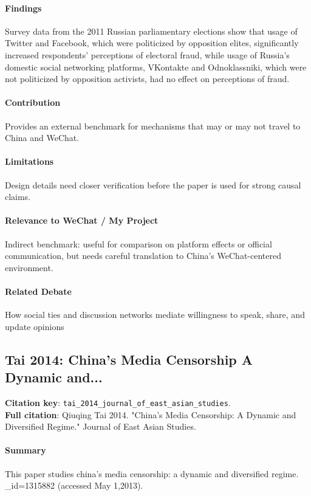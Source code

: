\documentclass[12pt]{article}
\begin{document}
\paragraph{Findings} Survey data from the 2011 Russian parliamentary elections show that usage of Twitter and Facebook, which were politicized by opposition elites, significantly increased respondents' perceptions of electoral fraud, while usage of Russia's domestic social networking platforms, VKontakte and Odnoklassniki, which were not politicized by opposition activists, had no effect on perceptions of fraud.

\paragraph{Contribution} Provides an external benchmark for mechanisms that may or may not travel to China and WeChat.

\paragraph{Limitations} Design details need closer verification before the paper is used for strong causal claims.

\paragraph{Relevance to WeChat / My Project} Indirect benchmark: useful for comparison on platform effects or official communication, but needs careful translation to China's WeChat-centered environment.

\paragraph{Related Debate} How social ties and discussion networks mediate willingness to speak, share, and update opinions


\subsection{Tai 2014: China's Media Censorship A Dynamic and...}
\textbf{Citation key}: \texttt{tai\_2014\_journal\_of\_east\_asian\_studies}.\\
\textbf{Full citation}: Qiuqing Tai 2014. "China's Media Censorship: A Dynamic and Diversified Regime." Journal of East Asian Studies.

\paragraph{Summary} This paper studies china's media censorship: a dynamic and diversified regime. \_id=1315882 (accessed May 1,2013).
\end{document}
